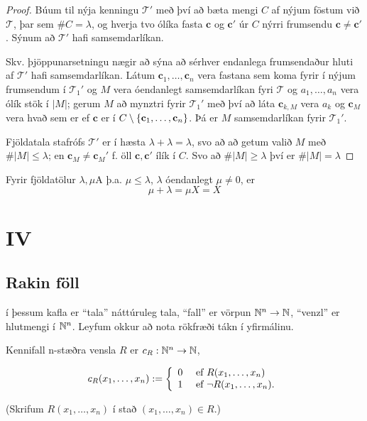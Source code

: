 \documentclass[12pt]{book}
\newcommand{\cT}{\mathcal{T}}
\newcommand{\bc}{\mathbf{c}}
\begin{document}
\begin{proof}
  Búum til nýja kenningu $\cT'$ með því að bæta mengi $C$ af nýjum
  föstum við $\cT$, þar sem $\# C = \lambda$, og hverja tvo ólíka
  fasta $\bc$ og $\bc'$ úr $C$ nýrri frumsendu $\bc \neq \bc'$.
  Sýnum að $\cT'$ hafi samsemdarlíkan.

  Skv. þjöppunarsetningu nægir að sýna að sérhver endanlega frumsendaður
  hluti af $\cT'$ hafi samsemdarlíkan. Látum $\bc_1, \dotsc, \bc_n$ vera
  fastana sem koma fyrir í nýjum
  frumsendum í $\cT_1'$ og $M$ vera óendanlegt samsemdarlíkan fyri $\cT$
  og $a_1, \dotsc, a_n$ 
vera ólík stök í $|M|$; gerum $M$ að mynztri fyrir $\cT_1'$ með því að láta
  $\bc_{k,M}$ vera $a_k$ og $\bc_M$ vera hvað sem er ef $\bc$ er í
  $C \setminus \set{\bc_1, \dotsc, \bc_n}$. Þá er $M$ samsemdarlíkan fyrir
  $\cT_1'$.

  Fjöldatala stafrófs $\cT'$ er í hæsta $\lambda + \lambda = \lambda$,
  svo að að getum valið $M$ með $\# |M| \leq \lambda$; en
  $\bc_M \neq \bc_M'$ f. öll $\bc, \bc'$ ílík í $C$. Svo að 
  $\# |M| \geq \lambda$ því er $\# |M| = \lambda$
  
  
\end{proof}

\begin{ath}
  Fyrir fjöldatölur $\lambda, \mu$A þ.a. $\mu \leq \lambda$, $\lambda$ óendanlegt
  $\mu \neq 0$, er 
  \[ \mu + \lambda = \mu X = X \]
\end{ath}


\chapter{IV}


\section{Rakin föll}

í þessum kafla er ``tala'' náttúruleg tala, ``fall'' er vörpun
$\mathbb{N}^{n} \to \mathbb{N}$, ``venzl'' er hlutmengi í $\mathbb{N}^{n}$. Leyfum okkur að nota
rökfræði tákn í yfirmálinu.

Kennifall n-stæðra vensla $R$ er 
$c_R: \mathbb{N}^n \to \mathbb{N}$,

\[ c_R (x_1, \dotsc, x_n) := \left\{ \begin{array}{l l} 0 & \text{ ef } R(x_1, \dotsc,x_n) \\ 1 & \text{ ef } \lnot R(x_1,\dotsc,x_n).\\ \end{array} \right. \]

(Skrifum $R(x_1,\dotsc, x_n)$ í stað $(x_1, \dotsc, x_n) \in R$.)
\end{document}
